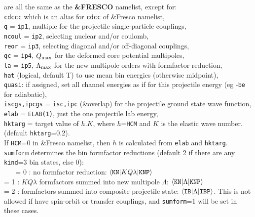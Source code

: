 \documentclass[11pt]{article}
\begin{document}
\vspace{-3mm}
are all the same as the {\bf \&FRESCO} namelist, except for:\\
{\tt cdccc} which is an alias for {\tt cdcc} of \&Fresco namelist,\\
{\tt q} = {\tt ip1}, multiple for the projectile single-particle couplings,\\
{\tt ncoul} = {\tt ip2}, selecting nuclear and/or coulomb,\\
{\tt reor} = {\tt ip3}, selecting diagonal and/or off-diagonal couplings,\\
{\tt qc} = {\tt ip4}, $Q_{\rm max}$ for the deformed core potential multipoles,\\
{\tt la} = {\tt ip5}, $\Lambda_{\rm max}$ for the new multipole orders with formfactor reduction,\\
{\tt hat} (logical, default T) to use mean bin energies (otherwise midpoint),\\
{\tt quasi}: if assigned, set all channel energies as if for this projectile
energy (eg -{\tt be} for adiabatic),\\
{\tt iscgs,ipcgs} = {\tt isc,ipc} (\&overlap) for the projectile ground state wave
function,\\
{\tt elab} = {\tt ELAB(1)}, just the one projectile lab energy,\\
{\tt hktarg} = target value of $h.K$, where $h$={\tt HCM} and $K$ is the elastic wave number.
(default {\tt hktarg}=0.2). \\
\hspace*{1cm} If {\tt HCM}=0 in \&Fresco namelist,
then $h$ is calculated from {\tt elab} and {\tt hktarg}.\\



{\tt sumform} determines the bin formfactor reductions
(default 2 if there are any {\tt kind}=3 bin states, else 0):\\
~ ~   = 0 : no formfactor reduction:
     $\langle {\tt KN} | K Q \lambda | {\tt KNP} \rangle$
\\    = 1 : $KQ\lambda$ formfactors summed into new multipole $\Lambda$:
     $\langle {\tt KN} | \Lambda | {\tt KNP} \rangle$
\\    = 2 : formfactors summed into composite projectile state:
     $\langle {\tt IB} | {\Lambda} | {\tt IBP} \rangle$.
      This is not allowed if have spin-orbit or transfer couplings, and
      {\tt sumform}=1 will be set in these cases.\\
\end{document}
